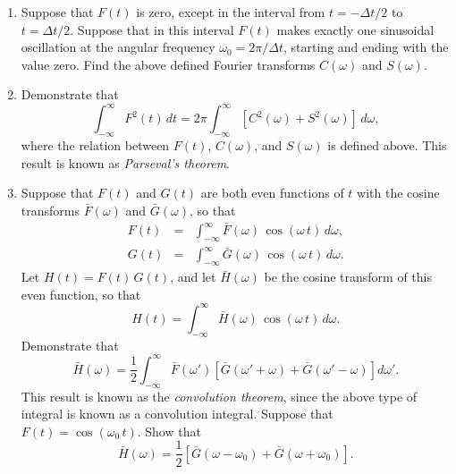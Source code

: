 {\begin{enumerate}
\item Suppose that $F(t)$ is zero, except in the interval from $t=-\Delta t/2$ to $t=\Delta t/2$. Suppose that in this
interval $F(t)$ makes exactly one sinusoidal oscillation at the angular frequency
$\omega_0 = 2\pi/\Delta t$, starting and ending with the value zero. Find the above defined Fourier transforms $C(\omega)$ and $S(\omega)$.

\item Demonstrate that
$$
\int_{-\infty}^\infty F^2(t)\,dt= 2\pi\int_{-\infty}^\infty[C^2(\omega)+S^2(\omega)]\,d\omega,
$$
where the relation between $F(t)$, $C(\omega)$, and $S(\omega)$ is defined above. 
This result is known as {\em Parseval's theorem}.

\item Suppose that $F(t)$ and $G(t)$ are both even functions of $t$ with the cosine
transforms $\bar{F}(\omega)$ and $\bar{G}(\omega)$, so that
\begin{eqnarray}
F(t)&=&\int_{-\infty}^\infty \bar{F}(\omega)\,\cos(\omega\,t)\,d\omega,\nonumber\\[0.5ex]
G(t)&=&\int_{-\infty}^\infty \bar{G}(\omega)\,\cos(\omega\,t)\,d\omega.\nonumber
\end{eqnarray}
Let $H(t)=F(t)\,G(t)$, and let $\bar{H}(\omega)$ be the cosine transform of
this even function, so that
$$
H(t)= \int_{-\infty}^\infty \bar{H}(\omega)\,\cos(\omega\,t)\,d\omega.
$$
Demonstrate that
$$
\bar{H}(\omega) = \frac{1}{2}\int_{-\infty}^\infty \bar{F}(\omega')\left[\bar{G}(\omega'+\omega) + \bar{G}(\omega'-\omega)\right] d\omega'.
$$
This result is known as the {\em convolution theorem}, since the above type of
integral is known as a convolution integral. Suppose that $F(t)=\cos(\omega_0\,t)$.
Show that
$$
\bar{H}(\omega) = \frac{1}{2}\left[\bar{G}(\omega-\omega_0)  + \bar{G}(\omega+\omega_0)\right].
$$

\end{enumerate}}